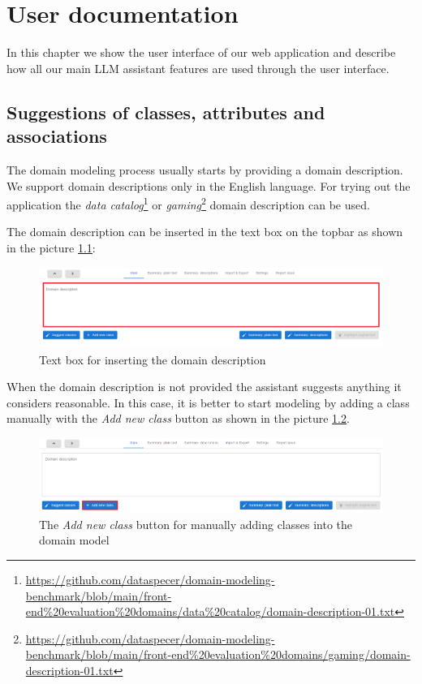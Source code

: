 \chapter{User documentation}
\label{chap:user_documentation}

In this chapter we show the user interface of our web application and describe how all our main LLM assistant features are used through the user interface.


\section{Suggestions of classes, attributes and associations}

The domain modeling process usually starts by providing a domain description. We support domain descriptions only in the English language. For trying out the application the \textit{data catalog}\footnote{\url{https://github.com/dataspecer/domain-modeling-benchmark/blob/main/front-end\%20evaluation\%20domains/data\%20catalog/domain-description-01.txt}} or \textit{gaming}\footnote{\url{https://github.com/dataspecer/domain-modeling-benchmark/blob/main/front-end\%20evaluation\%20domains/gaming/domain-description-01.txt}} domain description can be used.

The domain description can be inserted in the text box on the topbar as shown in the picture \ref{fig:domain-description-text-box}:

\begin{figure}[!h]
    \includegraphics[scale=0.36]{../docs/images/frontend/insert-domain-description.png}
    \caption{\centering Text box for inserting the domain description}
    \label{fig:domain-description-text-box}
\end{figure}

When the domain description is not provided the assistant suggests anything it considers reasonable. In this case, it is better to start modeling by adding a class manually with the \textit{Add new class} button as shown in the picture \ref{fig:add_new_class}.

\begin{figure}[!h]
    \includegraphics[scale=0.36]{../docs/images/frontend/add-new-class-manually.png}
    \caption{\centering The \textit{Add new class} button for manually adding classes into the domain model}
    \label{fig:add_new_class}
\end{figure}

